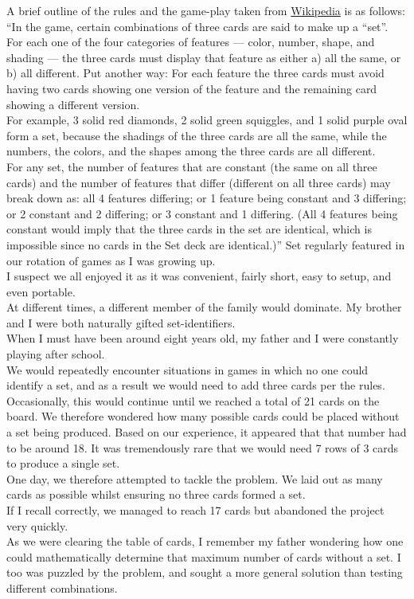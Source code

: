 \documentclass{article}
\theoremstyle{definition}
\theoremstyle{remark}
\begin{document}
A brief outline of the rules and the game-play taken from \href{https://en.wikipedia.org/wiki/Set_(card_game)}{Wikipedia} is as follows:\\
``In the game, certain combinations of three cards are said to make up a ``set''. For each one of the four categories of features --- color, number, shape, and shading --- the three cards must display that feature as either a) all the same, or b) all different. Put another way: For each feature the three cards must avoid having two cards showing one version of the feature and the remaining card showing a different version.\\
For example, 3 solid red diamonds, 2 solid green squiggles, and 1 solid purple oval form a set, because the shadings of the three cards are all the same, while the numbers, the colors, and the shapes among the three cards are all different.\\
For any set, the number of features that are constant (the same on all three cards) and the number of features that differ (different on all three cards) may break down as: all 4 features differing; or 1 feature being constant and 3 differing; or 2 constant and 2 differing; or 3 constant and 1 differing. (All 4 features being constant would imply that the three cards in the set are identical, which is impossible since no cards in the Set deck are identical.)''
\medbreak
Set regularly featured in our rotation of games as I was growing up.\\
I suspect we all enjoyed it as it was convenient, fairly short, easy to setup, and even portable. \\
At different times,  a different member of the family would dominate. My brother and I were both naturally gifted set-identifiers.\\
When I must have been around eight years old, my father and I were constantly playing after school. \\
We would repeatedly encounter situations in games in which no one could identify a set, and as a result we would need to add three cards per the rules. \\
Occasionally, this would continue until we reached a total of 21 cards on the board. We therefore wondered how many possible cards could be placed without a set being produced.
\medbreak
Based on our experience, it appeared that that number had to be around 18. It was tremendously rare that we would need 7 rows of 3 cards to produce a single set.\\
One day, we therefore attempted to tackle the problem. We laid out as many cards as possible whilst ensuring no three cards formed a set.\\
If I recall correctly, we managed to reach 17 cards but abandoned the project very quickly.\\
As we were clearing the table of cards, I remember my father wondering how one could mathematically determine that maximum number of cards without a set. I too was puzzled by the problem, and sought a more general solution than testing different combinations. 
\end{document}
